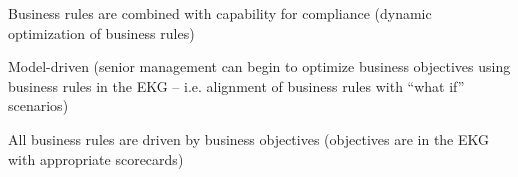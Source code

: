 \begin{members-only}
\begin{scoring}
\end{scoring}

\kgmmscoringlevelFour

\begin{scoring}

    \item Business rules are combined with  capability for compliance (dynamic optimization of
          business rules)
    \item Model-driven (senior management can begin to optimize business objectives using business rules in the EKG --
          i.e. alignment of business rules with “what if” scenarios)

\end{scoring}

\kgmmscoringlevelFive

\begin{scoring}

    \item All business rules are driven by business objectives (objectives are in the EKG with appropriate scorecards)

\end{scoring}

\end{members-only}
